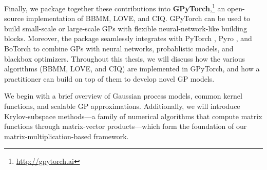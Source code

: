 \noindent
Finally, we package together these contributions into {\bf GPyTorch},\footnote{
  \url{http://gpytorch.ai}
}
an open-source implementation of BBMM, LOVE, and CIQ.
GPyTorch can be used to build small-scale or large-scale GPs with flexible neural-network-like building blocks.
Moreover, the package seamlessly integrates with PyTorch \cite{paszke2019pytorch}, Pyro \cite{bingham2019pyro}, and BoTorch \cite{balandat2019botorch} to combine GPs with neural networks, probablistic models, and blackbox optimizers.
Throughout this thesis, we will discuss how the various algorithms (BBMM, LOVE, and CIQ) are implemented in GPyTorch, and how a practitioner can build on top of them to develop novel GP models.

We begin with a brief overview of Gaussian process models, common kernel functions, and scalable GP approximations.
Additionally, we will introduce Krylov-subspace methods---a family of numerical algorithms that compute matrix functions through matrix-vector products---which form the foundation of our matrix-multiplication-based framework.




